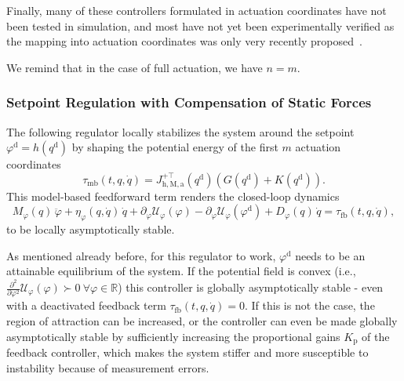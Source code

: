 Finally, many of these controllers formulated in actuation coordinates have not been tested in simulation, and most have not yet been experimentally verified as the mapping into actuation coordinates was only very recently proposed~\citep{pustina2024input}.

We remind that in the case of full actuation, we have $n = m$.

\subsubsection{Setpoint Regulation with Compensation of Static Forces}
The following regulator locally stabilizes the system around the setpoint $\varphi^\mathrm{d} = h(q^\mathrm{d})$ by shaping the potential energy of the first $m$ actuation coordinates~\citep{borja2022energy, della2023model}
\begin{equation}\label{eq:background:model_based_control:potential_shaping_regulation}
    \tau_\mathrm{mb}(t, q, \dot{q}) = J_{\mathrm{h},\mathrm{M},\mathrm{a}}^{+\top}(q^\mathrm{d}) \left ( G(q^\mathrm{d}) + K(q^\mathrm{d}) \right ).
\end{equation}
This model-based feedforward term renders the closed-loop dynamics
\begin{equation}
    M_\varphi(q) \, \ddot{\varphi} + \eta_\varphi(q,\dot{q}) \, \dot{q} + \partial_{\varphi} \mathcal{U}_\varphi(\varphi) - \partial_{\varphi} \mathcal{U}_\varphi(\varphi^\mathrm{d}) + D_\varphi(q) \, \dot{q} = \tau_\mathrm{fb}(t, q, \dot{q}),
\end{equation}
to be locally asymptotically stable.

As mentioned already before, for this regulator to work, $\varphi^\mathrm{d}$ needs to be an attainable equilibrium of the system.
If the potential field is convex (i.e., $\frac{\partial^2}{\partial \varphi^2}  \mathcal{U}_\varphi(\varphi) \succ 0 \: \forall \varphi \in \mathbb{R}$) this controller is globally asymptotically stable - even with a deactivated feedback term $\tau_\mathrm{fb}(t,q,\dot{q})=0$. If this is not the case, the region of attraction can be increased, or the controller can even be made globally asymptotically stable by sufficiently increasing the proportional gains $K_\mathrm{p}$ of the feedback controller, which makes the system stiffer and more susceptible to instability because of measurement errors.

